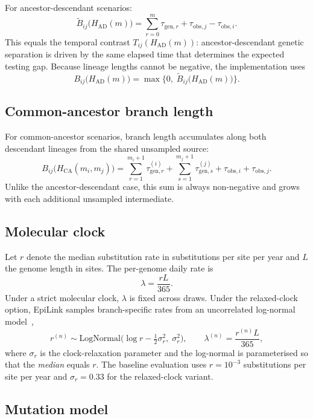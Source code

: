 \documentclass[11pt,a4paper]{article}
\begin{document}
For ancestor-descendant scenarios:
\[
\widetilde{B}_{ij}\!\bigl(H_{\mathrm{AD}}(m)\bigr)
= \sum_{r=0}^{m} \tau_{\mathrm{gen},r}
+ \tau_{\mathrm{obs},j}
- \tau_{\mathrm{obs},i}.
\]
This equals the temporal contrast $T_{ij}(H_{\mathrm{AD}}(m))$: ancestor-descendant genetic separation is driven by the same elapsed time that determines the expected testing gap. Because lineage lengths cannot be negative, the implementation uses
\[
B_{ij}\!\bigl(H_{\mathrm{AD}}(m)\bigr)
= \max\!\bigl\{0,\;\widetilde{B}_{ij}\!\bigl(H_{\mathrm{AD}}(m)\bigr)\bigr\}.
\]

\subsection{Common-ancestor branch length}
\label{sec:S1_ca_branch}

For common-ancestor scenarios, branch length accumulates along both descendant lineages from the shared unsampled source:
\[
B_{ij}\!\bigl(H_{\mathrm{CA}}(m_i,m_j)\bigr)
= \sum_{r=1}^{m_i+1} \tau_{\mathrm{gen},r}^{(i)}
+ \sum_{s=1}^{m_j+1} \tau_{\mathrm{gen},s}^{(j)}
+ \tau_{\mathrm{obs},i}
+ \tau_{\mathrm{obs},j}.
\]
Unlike the ancestor-descendant case, this sum is always non-negative and grows with each additional unsampled intermediate.

\subsection{Molecular clock}
\label{sec:S1_clock}

Let $r$ denote the median substitution rate in substitutions per site per year and $L$ the genome length in sites. The per-genome daily rate is
\[
\lambda = \frac{rL}{365}.
\]
Under a strict molecular clock, $\lambda$ is fixed across draws. Under the relaxed-clock option, EpiLink samples branch-specific rates from an uncorrelated log-normal model~\cite{Drummond2006},
\[
r^{(n)} \sim \mathrm{LogNormal}\!\bigl(\log r - \tfrac{1}{2}\sigma_r^2,\; \sigma_r^2\bigr),
\qquad
\lambda^{(n)} = \frac{r^{(n)} L}{365},
\]
where $\sigma_r$ is the clock-relaxation parameter and the log-normal is parameterised so that the \emph{median} equals $r$. The baseline evaluation uses $r = 10^{-3}$ substitutions per site per year and $\sigma_r = 0.33$ for the relaxed-clock variant.

\subsection{Mutation model}
\label{sec:S1_mutation}
\end{document}
